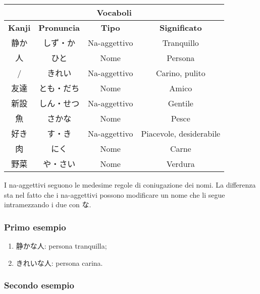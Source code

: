 \documentclass{article}
\let\ita\textitalian
\let\jap\textjapanese
\newcommand{\itabf}[1]{\ita{\textbf{#1}}}
\newenvironment{tabAdj}{\begin{center}\begin{japanese}\begin{longtable}{|c|c|c|c|}}{\end{longtable}\end{japanese}\end{center}}
\begin{document}
            \begin{tabAdj}
                \hline
                \multicolumn{4}{|c|}{\itabf{Vocaboli}}\\
                \hline
                \itabf{Kanji} & \itabf{Pronuncia} & \itabf{Tipo} & \itabf{Significato}\\
                \hline\hline
                静か & しず・か & \ita{Na-aggettivo} & \ita{Tranquillo}\\
                \hline
                人 & ひと & \ita{Nome} & \ita{Persona}\\
                \hline
                / & きれい & \ita{Na-aggettivo} & \ita{Carino, pulito}\\
                \hline
                友達 & とも・だち & \ita{Nome} & \ita{Amico}\\
                \hline
                新設 & しん・せつ & \ita{Na-aggettivo} & \ita{Gentile}\\
                \hline
                魚 & さかな & \ita{Nome} & \ita{Pesce}\\
                \hline
                好き & す・き & \ita{Na-aggettivo} & \ita{Piacevole, desiderabile}\\
                \hline
                肉 & にく & \ita{Nome} & \ita{Carne}\\
                \hline
                野菜 & や・さい & \ita{Nome} & \ita{Verdura}\\
                \hline
            \end{tabAdj}

            I na-aggettivi seguono le medesime regole di coniugazione dei nomi. La differenza sta nel fatto che i na-aggettivi possono
            modificare un nome che li segue intramezzando i due con \jap{な}.

            \subsubsection*{Primo esempio}

                \begin{enumerate}
                    \item \jap{静かな人}: persona tranquilla;
                    \item \jap{きれいな人}: persona carina.
                \end{enumerate}

            \subsubsection*{Secondo esempio}
\end{document}
